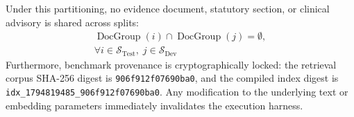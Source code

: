 Under this partitioning, no evidence document, statutory section, or clinical advisory is shared across splits:
\begin{equation}
\begin{split}
    \operatorname{DocGroup}(i) \cap \operatorname{DocGroup}(j) = \emptyset, \\
    \forall i \in \mathcal{S}_{\text{Test}}, \; j \in \mathcal{S}_{\text{Dev}}
\end{split}
\label{eq:document_isolation}
\end{equation}
Furthermore, benchmark provenance is cryptographically locked: the retrieval corpus SHA-256 digest is \texttt{906f912f07690ba0}, and the compiled index digest is \texttt{idx\_1794819485\_906f912f07690ba0}. Any modification to the underlying text or embedding parameters immediately invalidates the execution harness.
